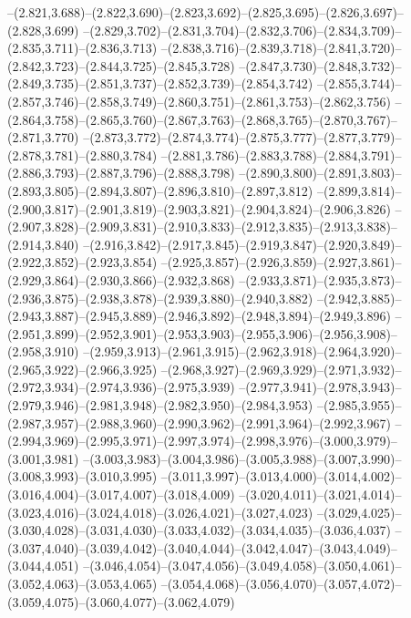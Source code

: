   --(2.821,3.688)--(2.822,3.690)--(2.823,3.692)--(2.825,3.695)--(2.826,3.697)--(2.828,3.699)%
  --(2.829,3.702)--(2.831,3.704)--(2.832,3.706)--(2.834,3.709)--(2.835,3.711)--(2.836,3.713)%
  --(2.838,3.716)--(2.839,3.718)--(2.841,3.720)--(2.842,3.723)--(2.844,3.725)--(2.845,3.728)%
  --(2.847,3.730)--(2.848,3.732)--(2.849,3.735)--(2.851,3.737)--(2.852,3.739)--(2.854,3.742)%
  --(2.855,3.744)--(2.857,3.746)--(2.858,3.749)--(2.860,3.751)--(2.861,3.753)--(2.862,3.756)%
  --(2.864,3.758)--(2.865,3.760)--(2.867,3.763)--(2.868,3.765)--(2.870,3.767)--(2.871,3.770)%
  --(2.873,3.772)--(2.874,3.774)--(2.875,3.777)--(2.877,3.779)--(2.878,3.781)--(2.880,3.784)%
  --(2.881,3.786)--(2.883,3.788)--(2.884,3.791)--(2.886,3.793)--(2.887,3.796)--(2.888,3.798)%
  --(2.890,3.800)--(2.891,3.803)--(2.893,3.805)--(2.894,3.807)--(2.896,3.810)--(2.897,3.812)%
  --(2.899,3.814)--(2.900,3.817)--(2.901,3.819)--(2.903,3.821)--(2.904,3.824)--(2.906,3.826)%
  --(2.907,3.828)--(2.909,3.831)--(2.910,3.833)--(2.912,3.835)--(2.913,3.838)--(2.914,3.840)%
  --(2.916,3.842)--(2.917,3.845)--(2.919,3.847)--(2.920,3.849)--(2.922,3.852)--(2.923,3.854)%
  --(2.925,3.857)--(2.926,3.859)--(2.927,3.861)--(2.929,3.864)--(2.930,3.866)--(2.932,3.868)%
  --(2.933,3.871)--(2.935,3.873)--(2.936,3.875)--(2.938,3.878)--(2.939,3.880)--(2.940,3.882)%
  --(2.942,3.885)--(2.943,3.887)--(2.945,3.889)--(2.946,3.892)--(2.948,3.894)--(2.949,3.896)%
  --(2.951,3.899)--(2.952,3.901)--(2.953,3.903)--(2.955,3.906)--(2.956,3.908)--(2.958,3.910)%
  --(2.959,3.913)--(2.961,3.915)--(2.962,3.918)--(2.964,3.920)--(2.965,3.922)--(2.966,3.925)%
  --(2.968,3.927)--(2.969,3.929)--(2.971,3.932)--(2.972,3.934)--(2.974,3.936)--(2.975,3.939)%
  --(2.977,3.941)--(2.978,3.943)--(2.979,3.946)--(2.981,3.948)--(2.982,3.950)--(2.984,3.953)%
  --(2.985,3.955)--(2.987,3.957)--(2.988,3.960)--(2.990,3.962)--(2.991,3.964)--(2.992,3.967)%
  --(2.994,3.969)--(2.995,3.971)--(2.997,3.974)--(2.998,3.976)--(3.000,3.979)--(3.001,3.981)%
  --(3.003,3.983)--(3.004,3.986)--(3.005,3.988)--(3.007,3.990)--(3.008,3.993)--(3.010,3.995)%
  --(3.011,3.997)--(3.013,4.000)--(3.014,4.002)--(3.016,4.004)--(3.017,4.007)--(3.018,4.009)%
  --(3.020,4.011)--(3.021,4.014)--(3.023,4.016)--(3.024,4.018)--(3.026,4.021)--(3.027,4.023)%
  --(3.029,4.025)--(3.030,4.028)--(3.031,4.030)--(3.033,4.032)--(3.034,4.035)--(3.036,4.037)%
  --(3.037,4.040)--(3.039,4.042)--(3.040,4.044)--(3.042,4.047)--(3.043,4.049)--(3.044,4.051)%
  --(3.046,4.054)--(3.047,4.056)--(3.049,4.058)--(3.050,4.061)--(3.052,4.063)--(3.053,4.065)%
  --(3.054,4.068)--(3.056,4.070)--(3.057,4.072)--(3.059,4.075)--(3.060,4.077)--(3.062,4.079)%
